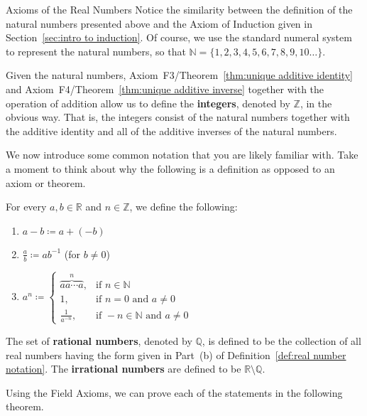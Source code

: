 \begin{section}{Axioms of the Real Numbers}
Notice the similarity between the definition of the natural numbers presented above and the Axiom of Induction given in Section~\ref{sec:intro to induction}. Of course, we use the standard numeral system to represent the natural numbers, so that $\mathbb{N}= \{1,2,3,4,5,6,7,8,9,10\ldots\}$.

Given the natural numbers, Axiom~F3/Theorem~\ref{thm:unique additive identity} and Axiom~F4/Theorem~\ref{thm:unique additive inverse} together with the operation of addition allow us to define the \textbf{integers}, denoted by $\mathbb{Z}$, in the obvious way.  That is, the integers consist of the natural numbers together with the additive identity and all of the additive inverses of the natural numbers.

We now introduce some common notation that you are likely familiar with.  Take a moment to think about why the following is a definition as opposed to an axiom or theorem.

\begin{definition}\label{def:real number notation}
For every $a,b\in\mathbb{R}$ and $n\in\mathbb{Z}$, we define the following:
\begin{enumerate}[label=\textrm{(\alph*)}]
\item $\boxed{a-b\coloneqq a+(-b)}$
\item $\boxed{\displaystyle\frac{a}{b}\coloneqq ab^{-1}}$ (for $b\neq 0$)
\item $\boxed{\displaystyle a^n\coloneqq \begin{cases}
\overbrace{aa\cdots a}^n, &\text{if }n\in \mathbb{N}\\
1, & \text{if }n=0\text{ and }a\neq 0\\
\displaystyle\frac{1}{a^{-n}}, & \text{if }-n\in \mathbb{N}\text{ and }a\neq 0
\end{cases}}$
\end{enumerate}
\end{definition}

The set of \textbf{rational numbers}, denoted by $\mathbb{Q}$, is defined to be the collection of all real numbers having the form given in Part~(b) of Definition~\ref{def:real number notation}.  The \textbf{irrational numbers} are defined to be $\mathbb{R}\setminus\mathbb{Q}$.

Using the Field Axioms, we can prove each of the statements in the following theorem.


\end{section}
